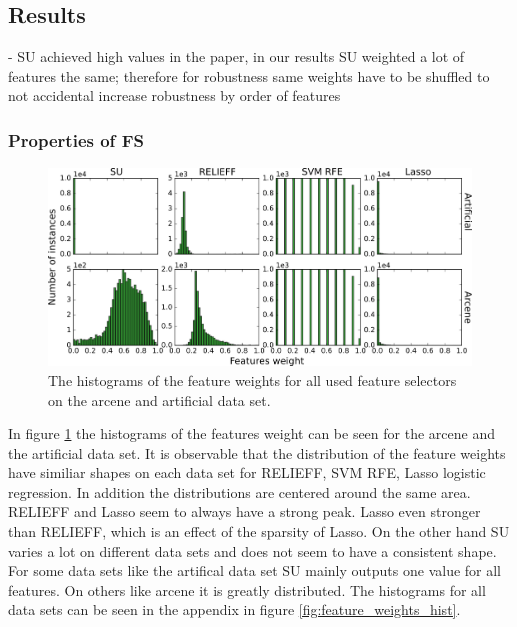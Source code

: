 \documentclass[twoside,11pt]{article}
\begin{document}
\subsection{Results}
- SU achieved high values in the paper, in our results SU weighted a lot of features the 
same; therefore for robustness same weights have to be shuffled to not accidental increase
robustness by order of features

\subsubsection{Properties of FS}
\begin{figure}[h!]
  \centering
    \includegraphics[width=\textwidth]{feature_weights_hist_arcene_artificial.png}
  \caption{The histograms of the feature weights for all used feature selectors on the arcene and artificial data set.}
  \label{fig:feature_weights_hist_arcene_artificial}
\end{figure}
In figure \ref{fig:feature_weights_hist_arcene_artificial} the histograms of the features weight can be seen for the arcene and the artificial data set. It is observable that the distribution of the feature weights have similiar shapes on each data set for RELIEFF, SVM RFE, Lasso logistic regression. In addition the distributions are centered around the same area. RELIEFF and Lasso seem to always have a strong peak. Lasso even stronger than RELIEFF, which is an effect of the sparsity of Lasso. On the other hand SU varies a lot on different data sets and does not seem to have a consistent shape. For some data sets like the artifical data set SU mainly outputs one value for all features. On others like arcene it is greatly distributed. The histograms for all data sets can be seen in the appendix in figure \ref{fig:feature_weights_hist}.
\end{document}
